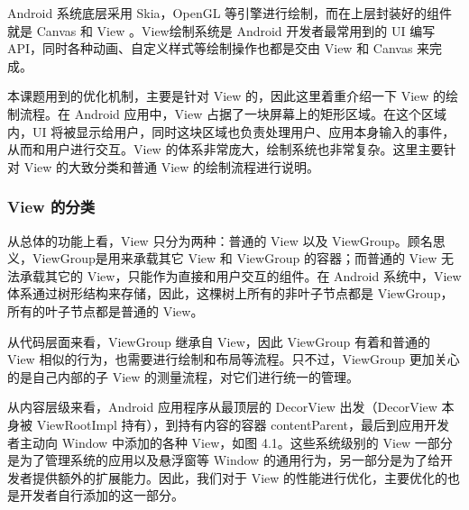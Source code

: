 Android 系统底层采用 Skia，OpenGL 等引擎进行绘制，而在上层封装好的组件就是 Canvas 和 View \cite{tahir2013learning}。View绘制系统是 Android 开发者最常用到的 UI 编写 API，同时各种动画、自定义样式等绘制操作也都是交由 View 和 Canvas 来完成。

本课题用到的优化机制，主要是针对 View 的，因此这里着重介绍一下 View 的绘制流程。在 Android 应用中，View 占据了一块屏幕上的矩形区域。在这个区域内，UI 将被显示给用户，同时这块区域也负责处理用户、应用本身输入的事件，从而和用户进行交互\cite{aljarrah2016maintaining}。View 的体系非常庞大，绘制系统也非常复杂。这里主要针对 View 的大致分类和普通 View 的绘制流程进行说明。

\subsubsection{View 的分类}

从总体的功能上看，View 只分为两种：普通的 View 以及 ViewGroup。顾名思义，ViewGroup是用来承载其它 View 和 ViewGroup 的容器；而普通的 View 无法承载其它的 View，只能作为直接和用户交互的组件。在 Android 系统中，View 体系通过树形结构来存储，因此，这棵树上所有的非叶子节点都是 ViewGroup，所有的叶子节点都是普通的 View。

从代码层面来看，ViewGroup 继承自 View，因此 ViewGroup 有着和普通的 View 相似的行为，也需要进行绘制和布局等流程。只不过，ViewGroup 更加关心的是自己内部的子 View 的测量流程，对它们进行统一的管理。\

从内容层级来看，Android 应用程序从最顶层的 DecorView 出发（DecorView 本身被 ViewRootImpl 持有），到持有内容的容器 contentParent，最后到应用开发者主动向 Window 中添加的各种 View，如图 4.1。这些系统级别的 View 一部分是为了管理系统的应用以及悬浮窗等 Window 的通用行为，另一部分是为了给开发者提供额外的扩展能力。因此，我们对于 View 的性能进行优化，主要优化的也是开发者自行添加的这一部分。


